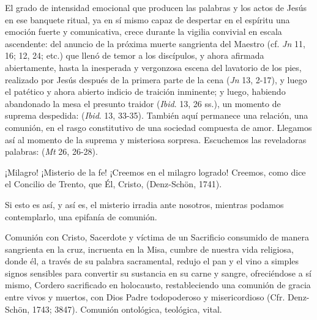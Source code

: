 \begin{body}
El grado de intensidad emocional que producen las palabras y los actos de Jesús en ese banquete ritual, ya en sí mismo capaz de despertar en el espíritu una emoción fuerte y comunicativa, crece durante la vigilia convivial en escala ascendente: del anuncio de la próxima muerte sangrienta del Maestro (cf. \textit{Jn} 11, 16; 12, 24; etc.) que llenó de temor a los discípulos, y ahora afirmada abiertamente, hasta la inesperada y vergonzosa escena del lavatorio de los pies, realizado por Jesús después de la primera parte de la cena (\textit{Jn} 13, 2-17), y luego el patético y ahora abierto indicio de traición inminente; y luego, habiendo abandonado la mesa el presunto traidor (\textit{Ibid}. 13, 26 ss.), un momento de suprema despedida:  (\textit{Ibid}. 13, 33-35). También aquí permanece una relación, una comunión, en el rasgo constitutivo de una sociedad compuesta de amor. Llegamos así al momento de la suprema y misteriosa sorpresa. Escuchemos las reveladoras palabras:  (\textit{Mt} 26, 26-28). 

¡Milagro! ¡Misterio de la fe! ¡Creemos en el milagro logrado! Creemos, como dice el Concilio de Trento, que Él, Cristo,  (Denz-Schön, 1741). 

Si esto es así, y así es, el misterio irradia ante nosotros, mientras podamos contemplarlo, una epifanía de comunión.

Comunión con Cristo, Sacerdote y víctima de un Sacrificio consumido de manera sangrienta en la cruz, incruenta en la Misa, cumbre de nuestra vida religiosa, donde él, a través de su palabra sacramental, redujo el pan y el vino a simples signos sensibles para convertir su sustancia en su carne y sangre, ofreciéndose a sí mismo, Cordero sacrificado en holocausto, restableciendo una comunión de gracia entre vivos y muertos, con Dios Padre todopoderoso y misericordioso (Cfr. Denz-Schön, 1743; 3847). Comunión ontológica, teológica, vital. 


\end{body}

